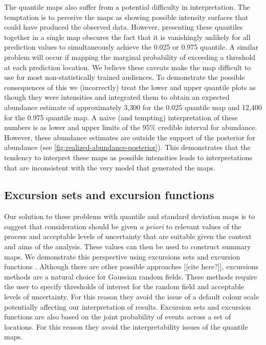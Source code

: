 \documentclass[preprint,12pt]{elsarticle}
\begin{document}
The quantile maps also suffer from a potential difficulty in interpretation. The temptation is to perceive the maps as showing possible intensity surfaces that could have produced the observed data.  However, presenting these quantiles together in a single map obscures the fact that it is vanishingly unlikely for all prediction values to simultaneously achieve the 0.025 or 0.975 quantile.  A similar problem will occur if mapping the marginal probability of exceeding a threshold at each prediction location.  We believe these caveats make the map difficult to use for most non-statistically trained audiences.  To demonstrate the possible consequences of this we (incorrectly) treat the lower and upper quantile plots as though they were intensities and integrated them to obtain an expected abundance estimate of approximately 3,300 for the 0.025 quantile map and 12,400 for the 0.975 quantile map.  A naive (and tempting) interpretation of these numbers is as lower and upper limits of the 95\% credible interval for abundance. However, these abundance estimates are outside the support of the posterior for abundance (see \autoref{fig:realized-abundance-posterior}).  This demonstrates that the tendency to interpret these maps as possible intensities leads to interpretations that are inconsistent with the very model that generated the maps.

\subsection{Excursion sets and excursion functions}

Our solution to these problems with quantile and standard deviation maps is to suggest that consideration should be given \emph{a priori} to relevant values of the process and acceptable levels of uncertainty that are suitable given the context and aims of the analysis.  These values can then be used to construct summary maps.  We demonstrate this perspective using excursions sets and excursion functions \citep{bolin_excursion_2015}.  Although there are other possible approaches [[cite here?]], excursions methods are a natural choice for Gaussian random fields.  These methods require the user to specify thresholds of interest for the random field and acceptable levels of uncertainty.  For this reason they avoid the issue of a default colour scale potentially affecting our interpretation of results.  Excursion sets and excursion functions are also based on the joint probability of events across a set of locations.  For this reason they avoid the interpretability issues of the quantile maps.
\end{document}
